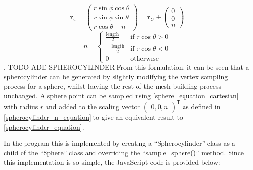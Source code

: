 \begin{equation}
\mathbf{r}_{c}=\begin{pmatrix}r\sin\phi \cos\theta\\
r\sin\phi \sin\theta\\
r\cos\theta + n\end{pmatrix}
=\mathbf{r}_{C}+\begin{pmatrix}0\\
0\\
n\end{pmatrix}
\label{spherocylinder_equation}
\end{equation}
\begin{equation}
n=\begin{cases}
  \frac{\text{length}}{2}&\text{if } r\cos\theta>0\\
  -\frac{\text{length}}{2}&\text{if } r\cos\theta<0\\
  0&\text{otherwise}
\end{cases}
\label{spherocylinder_n_equation}
\end{equation}.
TODO ADD SPHEROCYLINDER
From this formulation, it can be seen that a spherocylinder can be generated by slightly modifying the vertex sampling process for a sphere, whilst leaving the rest of the mesh building process unchanged. A sphere point can be sampled using \cref{sphere_equation_cartesian} with radius $r$ and added to the scaling vector $\begin{pmatrix}0,0,n\end{pmatrix}^\mathsf{T}$ as defined in \cref{spherocylinder_n_equation} to give an equivalent result to \cref{spherocylinder_equation}.

In the program this is implemented by creating a ``Spherocylinder'' class as a child of the ``Sphere'' class and overriding the ``sample\_sphere()'' method. Since this implementation is so simple, the JavaScript code is provided below:

